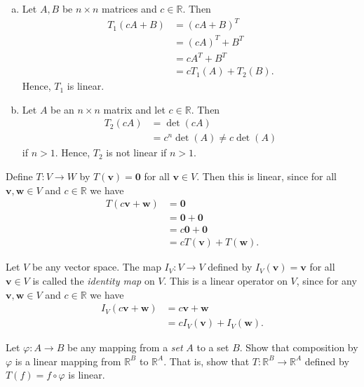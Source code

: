 \documentclass[12pt,letterpaper,reqno]{article}
\numberwithin{equation}{section}
\newcommand{\R}{\ensuremath{\mathbb R}}
\begin{document}
{\color{red}
\begin{solution}
\begin{enumerate}[(a)]
	\item Let $A,B$ be $n \times n$ matrices and $c \in \mathbb{R}$. Then 
	\begin{align*}
		T_1(cA+B)&=(cA+B)^T \\
		&=(cA)^T+B^T \\
		&=cA^T+B^T \\
		&=cT_1(A)+T_2(B).
	\end{align*}
	Hence, $T_1$ is linear.
	\item Let $A$ be an $n \times n$ matrix and let $c \in \mathbb{R}$. Then
	\begin{align*}
		T_2(cA)&=\det(cA) \\
		&=c^n\det(A) \neq c\det(A)
	\end{align*}
	if $n>1$. Hence, $T_2$ is not linear if $n>1$.
\end{enumerate}	
\end{solution}}

\begin{example}
	Define $T:V \to W$ by $T(\mathbf{v})=\mathbf{0}$ for all $\mathbf{v} \in V$. Then this is linear, since for all $\mathbf{v}, \mathbf{w} \in V$ and $c \in \mathbb{R}$ we have
	\begin{align*}
		T(c\mathbf{v}+\mathbf{w})&=\mathbf{0} \\
		&=\mathbf{0}+\mathbf{0} \\
		&=c\mathbf{0}+\mathbf{0} \\
		&=cT(\mathbf{v})+T(\mathbf{w}).
	\end{align*}
\end{example}

\begin{example}\label{ex:the_identity_map}
Let $V$ be any vector space. The map $I_V:V \to V$ defined by $I_V(\mathbf{v})=\mathbf{v}$ for all $\mathbf{v} \in V$ is called the \emph{identity map} on $V$. This is a linear operator on $V$, since for any $\mathbf{v},\mathbf{w} \in V$ and $c \in \mathbb{R}$ we have
\begin{align*}
	I_V(c\mathbf{v}+\mathbf{w})&=c\mathbf{v}+\mathbf{w} \\
	&=cI_V(\mathbf{v})+I_V(\mathbf{w}).
\end{align*}
\end{example}

\begin{exercise}
Let $\varphi:A \to B$ be any mapping from a \emph{set} $A$ to a set $B$. Show that composition by $\varphi$ is a linear mapping from $\mathbb{R}^B$ to $\mathbb{R}^A$. That is, show that $T:\R^B \to \R^A$ defined by $T(f)=f \circ \varphi$ is linear.
\end{exercise}
\end{document}
